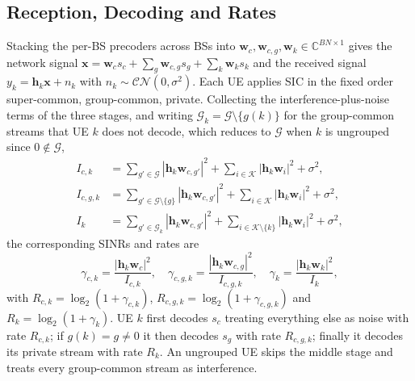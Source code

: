 \subsection{Reception, Decoding and Rates}
Stacking the per-BS precoders across BSs into $\mathbf{w}_c, \mathbf{w}_{c,g}, \mathbf{w}_k \in \mathbb{C}^{BN\times1}$ gives the network signal $\mathbf{x} = \mathbf{w}_c s_c + \sum_{g} \mathbf{w}_{c,g} s_g + \sum_{k} \mathbf{w}_k s_k$ and the received signal $y_k = \mathbf{h}_k \mathbf{x} + n_k$ with $n_k \sim \mathcal{CN}(0, \sigma^2)$. Each UE applies SIC in the fixed order super-common, group-common, private. Collecting the interference-plus-noise terms of the three stages, and writing $\mathcal{G}_k = \mathcal{G}\setminus\{g(k)\}$ for the group-common streams that UE $k$ does not decode, which reduces to $\mathcal{G}$ when $k$ is ungrouped since $0 \notin \mathcal{G}$,
\begin{subequations} \label{eq:Idefs}
\begin{align}
I_{c,k} &= \textstyle\sum_{g' \in \mathcal{G}} |\mathbf{h}_k \mathbf{w}_{c,g'}|^2 + \sum_{i \in \mathcal{K}} |\mathbf{h}_k \mathbf{w}_i|^2 + \sigma^2, \\
I_{c,g,k} &= \textstyle\sum_{g' \in \mathcal{G}\setminus\{g\}} |\mathbf{h}_k \mathbf{w}_{c,g'}|^2 + \sum_{i \in \mathcal{K}} |\mathbf{h}_k \mathbf{w}_i|^2 + \sigma^2, \\
I_{k} &= \textstyle\sum_{g' \in \mathcal{G}_k} |\mathbf{h}_k \mathbf{w}_{c,g'}|^2 + \sum_{i \in \mathcal{K}\setminus\{k\}} |\mathbf{h}_k \mathbf{w}_i|^2 + \sigma^2,
\end{align}
\end{subequations}
the corresponding SINRs and rates are
\begin{equation} \label{eq:sinr}
\gamma_{c,k} = \frac{|\mathbf{h}_k\mathbf{w}_c|^2}{I_{c,k}}, \quad \gamma_{c,g,k} = \frac{|\mathbf{h}_k\mathbf{w}_{c,g}|^2}{I_{c,g,k}}, \quad \gamma_k = \frac{|\mathbf{h}_k\mathbf{w}_k|^2}{I_k},
\end{equation}
with $R_{c,k} = \log_2(1+\gamma_{c,k})$, $R_{c,g,k} = \log_2(1+\gamma_{c,g,k})$ and $R_k = \log_2(1+\gamma_k)$. UE $k$ first decodes $s_c$ treating everything else as noise with rate $R_{c,k}$; if $g(k) = g \ne 0$ it then decodes $s_g$ with rate $R_{c,g,k}$; finally it decodes its private stream with rate $R_{k}$. An ungrouped UE skips the middle stage and treats every group-common stream as interference.

